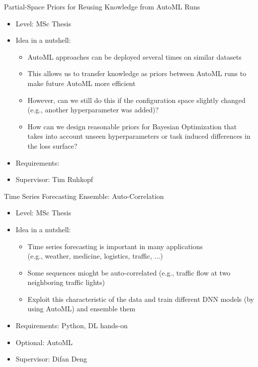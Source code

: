 \documentclass[aspectratio=169]{../latex_main/tntbeamer}  %
\begin{document}
\begin{frame}[c]{Partial-Space Priors for Reusing Knowledge from AutoML Runs}
 
	\begin{itemize}
		\item Level: MSc Thesis
		\item Idea in a nutshell:
		\begin{itemize}
		    \item AutoML approaches can be deployed several times on similar datasets
		    \item This allows us to transfer knowledge as priors between AutoML runs to make future AutoML more efficient
		    \item However, can we still do this if the configuration space slightly changed (e.g., another hyperparameter was added)?
		    \item How can we design reasonable priors for Bayesian Optimization that takes into account unseen hyperparameters or task induced differences in the loss surface?
		\end{itemize}
		\item Requirements:
		\item Supervisor: Tim Ruhkopf
	\end{itemize}
\end{frame}

\begin{frame}[c]{Time Series Forecasting Ensemble: Auto-Correlation}
 
	\begin{itemize}
		\item Level: MSc Thesis
		\item Idea in a nutshell:
		\begin{itemize}
		    \item Time series forecasting is important in many applications\\ (e.g., weather, medicine, logistics, traffic, ...)
		    \item Some sequences mioght be auto-correlated (e.g., traffic flow at two neighboring traffic lights)
		    \item Exploit this characteristic of the data and train different DNN models (by using AutoML) and ensemble them 
		\end{itemize}
		\item Requirements: Python, DL hands-on
		\item Optional: AutoML
		\item Supervisor: Difan Deng
	\end{itemize}
\end{frame}
\end{document}
